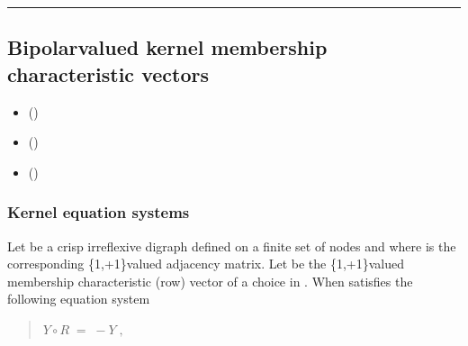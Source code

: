 \documentclass[a4paper,12pt,english]{sphinxhowto}
\begin{document}
\bigskip\hrule\bigskip



\subsection{Bipolar\sphinxhyphen{}valued kernel membership characteristic vectors}
\label{\detokenize{pearls:bipolar-valued-kernel-membership-characteristic-vectors}}\label{\detokenize{pearls:bipolar-valued-kernels-tutorial-label}}
\begin{sphinxcontents}
\begin{itemize}
\item {} 
\sphinxAtStartPar
{}\label{\detokenize{pearls:id162}}{\hyperref[\detokenize{pearls:kernel-equation-systems}]{}} ()

\item {} 
\sphinxAtStartPar
{}\label{\detokenize{pearls:id163}}{\hyperref[\detokenize{pearls:solving-bipolar-valued-kernel-equation-systems}]{}} ()

\item {} 
\sphinxAtStartPar
{}\label{\detokenize{pearls:id164}}{\hyperref[\detokenize{pearls:historical-notes}]{}} ()

\end{itemize}
\end{sphinxcontents}


\subsubsection{Kernel equation systems}
\label{\detokenize{pearls:kernel-equation-systems}}
\sphinxAtStartPar
Let  be a crisp irreflexive digraph defined on a finite set  of nodes and where  is the corresponding \{\sphinxhyphen{}1,+1\}\sphinxhyphen{}valued adjacency matrix. Let  be the \{\sphinxhyphen{}1,+1\}\sphinxhyphen{}valued membership characteristic (row) vector of a choice in . When  satisfies the following equation system
\begin{quote}

\sphinxAtStartPar
\(Y \circ R \; = \; -Y\;,\)
\end{quote}
\end{document}
